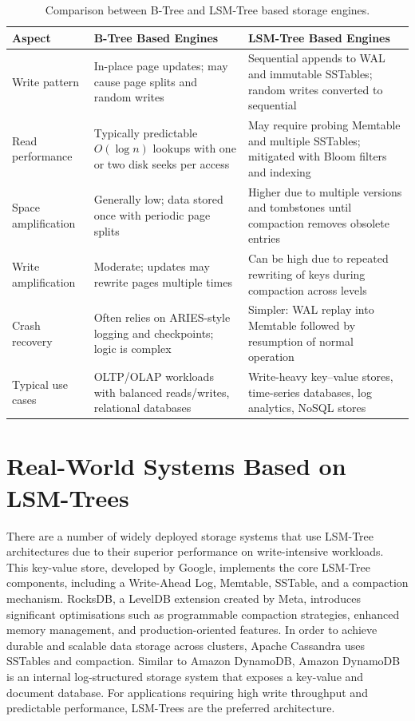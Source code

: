 \documentclass{mnitjaipur}
\begin{document}
\begin{table}[h]
    \centering
    \begin{tabular}{p{3cm}p{5cm}p{5cm}}
        \toprule
        \textbf{Aspect} & \textbf{B-Tree Based Engines} & \textbf{LSM-Tree Based Engines} \\
        \midrule
        Write pattern &
        In-place page updates; may cause page splits and random writes &
        Sequential appends to WAL and immutable SSTables; random writes converted to sequential \\
        \midrule
        Read performance &
        Typically predictable $O(\log n)$ lookups with one or two disk seeks per access &
        May require probing Memtable and multiple SSTables; mitigated with Bloom filters and indexing \\
        \midrule
        Space amplification &
        Generally low; data stored once with periodic page splits &
        Higher due to multiple versions and tombstones until compaction removes obsolete entries \\
        \midrule
        Write amplification &
        Moderate; updates may rewrite pages multiple times &
        Can be high due to repeated rewriting of keys during compaction across levels \\
        \midrule
        Crash recovery &
        Often relies on ARIES-style logging and checkpoints; logic is complex &
        Simpler: WAL replay into Memtable followed by resumption of normal operation \\
        \midrule
        Typical use cases &
        OLTP/OLAP workloads with balanced reads/writes, relational databases &
        Write-heavy key--value stores, time-series databases, log analytics, NoSQL stores \\
        \bottomrule
    \end{tabular}
    \caption{Comparison between B-Tree and LSM-Tree based storage engines.}
    \label{tab:btrees-lsmtrees}
\end{table}


\section{Real-World Systems Based on LSM-Trees}

There are a number of widely deployed storage systems that use LSM-Tree architectures due to their superior performance on write-intensive workloads. This key-value store, developed by Google, implements the core LSM-Tree components, including a Write-Ahead Log, Memtable, SSTable, and a compaction mechanism. RocksDB, a LevelDB extension created by Meta, introduces significant optimisations such as programmable compaction strategies, enhanced memory management, and production-oriented features. In order to achieve durable and scalable data storage across clusters, Apache Cassandra uses SSTables and compaction. Similar to Amazon DynamoDB, Amazon DynamoDB is an internal log-structured storage system that exposes a key-value and document database. For applications requiring high write throughput and predictable performance, LSM-Trees are the preferred architecture.
\end{document}
